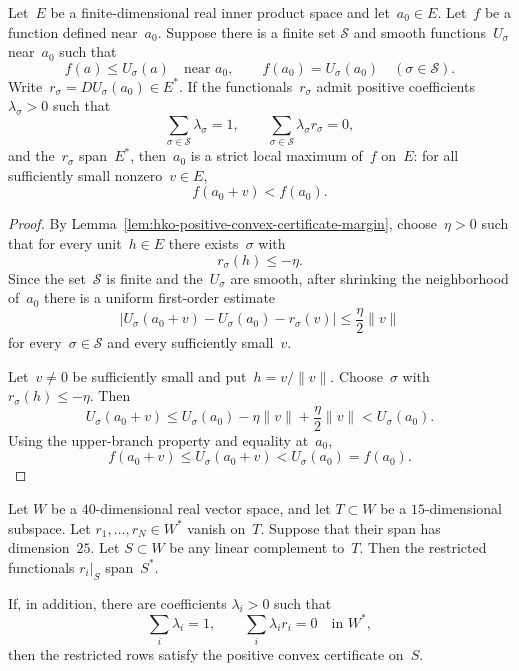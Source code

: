 \begin{proposition}
\label{prop:hko-feasible-branch-slice-local-max}
Let~$E$ be a finite-dimensional real inner product space and let~$a_0\in E$.
Let~$f$ be a function defined near~$a_0$.  Suppose there is a finite set
$\mathcal S$ and smooth functions~$U_\sigma$ near~$a_0$ such that
\[
  f(a)\leq U_\sigma(a)
  \quad\text{near }a_0,
  \qquad
  f(a_0)=U_\sigma(a_0)
  \quad
  (\sigma\in\mathcal S).
\]
Write~$r_\sigma=DU_\sigma(a_0)\in E^*$.  If the functionals~$r_\sigma$
admit positive coefficients~$\lambda_\sigma>0$ such that
\[
  \sum_{\sigma\in\mathcal S}\lambda_\sigma=1,\qquad
  \sum_{\sigma\in\mathcal S}\lambda_\sigma r_\sigma=0,
\]
and the~$r_\sigma$ span~$E^*$, then~$a_0$ is a strict local maximum of~$f$
on~$E$: for all sufficiently small nonzero~$v\in E$,
\[
  f(a_0+v)<f(a_0).
\]
\end{proposition}

\begin{proof}
By Lemma~\ref{lem:hko-positive-convex-certificate-margin}, choose~$\eta>0$
such that for every unit~$h\in E$ there exists~$\sigma$ with
\[
  r_\sigma(h)\leq-\eta.
\]
Since the set~$\mathcal S$ is finite and the~$U_\sigma$ are smooth, after
shrinking the neighborhood of~$a_0$ there is a uniform first-order estimate
\[
  \left|U_\sigma(a_0+v)-U_\sigma(a_0)-r_\sigma(v)\right|
  \leq \frac{\eta}{2}\|v\|
\]
for every~$\sigma\in\mathcal S$ and every sufficiently small~$v$.

Let~$v\neq0$ be sufficiently small and put~$h=v/\|v\|$.  Choose~$\sigma$
with~$r_\sigma(h)\leq-\eta$.  Then
\[
  U_\sigma(a_0+v)
  \leq
  U_\sigma(a_0)-\eta\|v\|+\frac{\eta}{2}\|v\|
  <
  U_\sigma(a_0).
\]
Using the upper-branch property and equality at~$a_0$,
\[
  f(a_0+v)
  \leq U_\sigma(a_0+v)
  <
  U_\sigma(a_0)
  =
  f(a_0).
\]
\end{proof}

\begin{lemma}
\label{lem:hko-ambient-rows-descend-to-slice}
Let $W$ be a $40$-dimensional real vector space, and let
$T\subset W$ be a $15$-dimensional subspace.  Let
$r_1,\ldots,r_N\in W^*$ vanish on~$T$.  Suppose that their span has
dimension~$25$.  Let $S\subset W$ be any linear complement to~$T$.
Then the restricted functionals $r_i|_S$ span~$S^*$.

If, in addition, there are coefficients $\lambda_i>0$ such that
\[
  \sum_i\lambda_i=1,
  \qquad
  \sum_i\lambda_i r_i=0
  \quad\text{in }W^*,
\]
then the restricted rows satisfy the positive convex certificate on~$S$.
\end{lemma}

